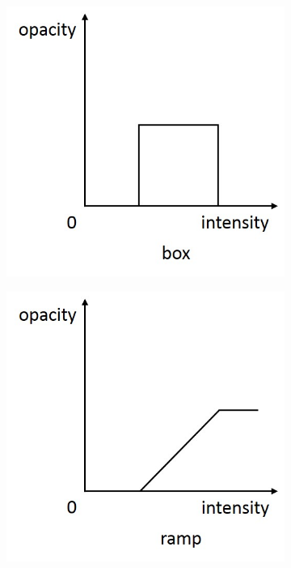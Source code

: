 \documentclass{egpubl}
\begin{document}
\begin{figure}
\begin{subfigure}{.2\textwidth}
	\end{subfigure}
	\begin{subfigure}{.2\textwidth}
		\includegraphics[width=1\textwidth]{konig_mastering_2000-zhou_automatic_2009_c.jpg}
	\end{subfigure}
	\begin{subfigure}{.2\textwidth}
		\includegraphics[width=1\textwidth]{konig_mastering_2000-zhou_automatic_2009_d.jpg}

\end{subfigure}
\end{figure}
\end{document}

